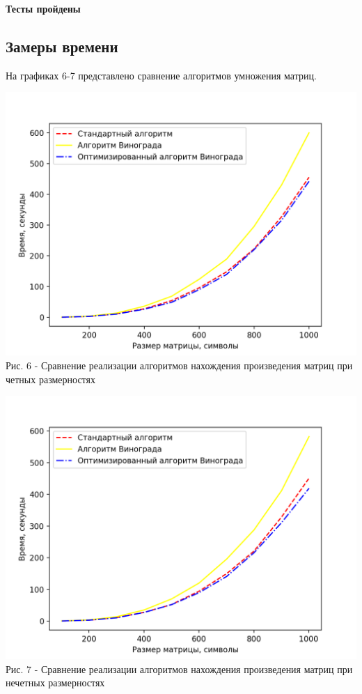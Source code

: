\documentclass[a4paper,14pt]{article} %
\begin{document}
	
	\textbf{Тесты пройдены}

	\subsection{Замеры времени}
	\hfill
	
	На графиках 6-7 представлено сравнение алгоритмов умножения матриц. 
	\begin{center}
        		\includegraphics[scale = 1]{graph1} \\ Рис. 6 - Сравнение реализации алгоритмов нахождения произведения матриц при четных размерностях
	\end{center}
	
	\begin{center}
        		\includegraphics[scale = 1]{graph2} \\ Рис. 7 - Сравнение реализации алгоритмов нахождения произведения матриц при нечетных размерностях
	\end{center}
	
\end{document}

